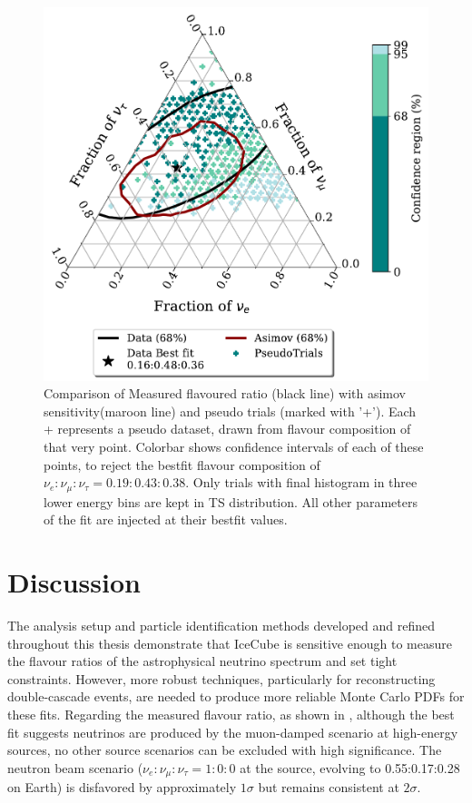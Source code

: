 \begin{figure}[h]
    
    \includegraphics{./figures/results/PE_data_asimov_68_BkgOnly.pdf}


    \caption{Comparison of Measured flavoured ratio (black line) with asimov sensitivity(maroon line) and pseudo trials (marked with '+'). Each + represents a pseudo dataset, drawn from flavour composition of that very point. Colorbar shows confidence intervals of each of these points, to reject the bestfit flavour composition of $\nu_e:\nu_{\mu}:\nu_{\tau} = 0.19:0.43:0.38$. Only trials with final histogram in three lower energy bins are kept in TS distribution. All other parameters of the fit are injected at their bestfit values.}
\end{figure}

\section{Discussion}
\label{sec:results_discussion}

The analysis setup and particle identification methods developed and refined throughout this thesis demonstrate that IceCube is sensitive enough to measure the flavour ratios of the astrophysical neutrino spectrum and set tight constraints. However, more robust techniques, particularly for reconstructing double-cascade events, are needed to produce more reliable Monte Carlo PDFs for these fits. Regarding the measured flavour ratio, as shown in , although the best fit suggests neutrinos are produced by the muon-damped scenario at high-energy sources, no other source scenarios can be excluded with high significance. The neutron beam scenario ($\nu_e:\nu_{\mu}:\nu_{\tau} = 1:0:0$ at the source, evolving to 0.55:0.17:0.28 on Earth) is disfavored by approximately $1\sigma$ but remains consistent at $2\sigma$.

